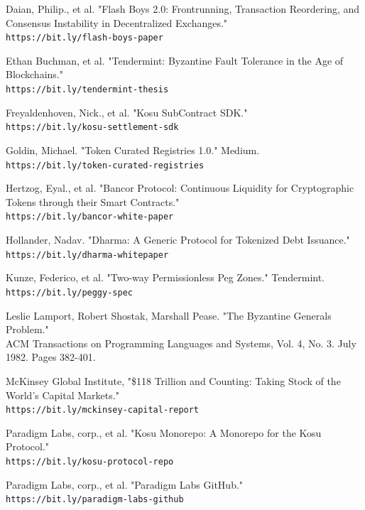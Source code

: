 \documentclass[10pt]{article}
\begin{document}
\begin{thebibliography}{9}
Daian, Philip., et al. "Flash Boys 2.0: Frontrunning, Transaction Reordering, and Consensus Instability in Decentralized Exchanges."
\\\texttt{https://bit.ly/flash-boys-paper}

Ethan Buchman, et al. "Tendermint: Byzantine Fault Tolerance in the Age of Blockchains."
\\\texttt{https://bit.ly/tendermint-thesis}

Freyaldenhoven, Nick., et al. "Kosu SubContract SDK."
\\\texttt{https://bit.ly/kosu-settlement-sdk}

Goldin, Michael. "Token Curated Registries 1.0." Medium.
\\\texttt{https://bit.ly/token-curated-registries}

Hertzog,  Eyal., et al. "Bancor Protocol: Continuous Liquidity for Cryptographic Tokens through their Smart Contracts."
\\\texttt{https://bit.ly/bancor-white-paper}

Hollander, Nadav. "Dharma: A Generic Protocol for Tokenized Debt Issuance."
\\\texttt{https://bit.ly/dharma-whitepaper}

Kunze, Federico, et al. "Two-way Permissionless Peg Zones." Tendermint.
\\\texttt{https://bit.ly/peggy-spec}

Leslie Lamport, Robert Shostak, Marshall Pease. "The Byzantine Generals Problem."
\\ACM Transactions on Programming Languages and Systems, Vol. 4, No. 3. July 1982. Pages 382-401.

McKinsey Global Institute, "\$118 Trillion and Counting: Taking Stock of the World's Capital Markets."
\\\texttt{https://bit.ly/mckinsey-capital-report}

Paradigm Labs, corp., et al. "Kosu Monorepo: A Monorepo for the Kosu Protocol."
\\\texttt{https://bit.ly/kosu-protocol-repo}

Paradigm Labs, corp., et al. "Paradigm Labs GitHub."
\\\texttt{https://bit.ly/paradigm-labs-github}


\end{thebibliography}
\end{document}
